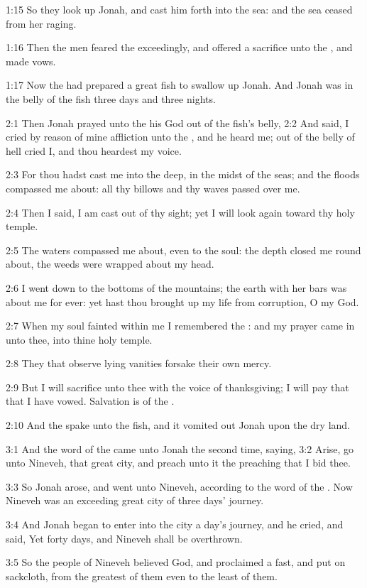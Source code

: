 1:15 So they look up Jonah, and cast him forth into the sea: and the sea ceased from her raging.

1:16 Then the men feared the \LORD exceedingly, and offered a sacrifice unto the \LORD, and made vows.

1:17 Now the \LORD had prepared a great fish to swallow up Jonah. And Jonah was in the belly of the fish three days and three nights.

2:1 Then Jonah prayed unto the \LORD his God out of the fish's belly, 2:2 And said, I cried by reason of mine affliction unto the \LORD, and he heard me; out of the belly of hell cried I, and thou heardest my voice.

2:3 For thou hadst cast me into the deep, in the midst of the seas; and the floods compassed me about: all thy billows and thy waves passed over me.

2:4 Then I said, I am cast out of thy sight; yet I will look again toward thy holy temple.

2:5 The waters compassed me about, even to the soul: the depth closed me round about, the weeds were wrapped about my head.

2:6 I went down to the bottoms of the mountains; the earth with her bars was about me for ever: yet hast thou brought up my life from corruption, O \LORD my God.

2:7 When my soul fainted within me I remembered the \LORD: and my prayer came in unto thee, into thine holy temple.

2:8 They that observe lying vanities forsake their own mercy.

2:9 But I will sacrifice unto thee with the voice of thanksgiving; I will pay that that I have vowed. Salvation is of the \LORD.

2:10 And the \LORD spake unto the fish, and it vomited out Jonah upon the dry land.

3:1 And the word of the \LORD came unto Jonah the second time, saying, 3:2 Arise, go unto Nineveh, that great city, and preach unto it the preaching that I bid thee.

3:3 So Jonah arose, and went unto Nineveh, according to the word of the \LORD. Now Nineveh was an exceeding great city of three days' journey.

3:4 And Jonah began to enter into the city a day's journey, and he cried, and said, Yet forty days, and Nineveh shall be overthrown.

3:5 So the people of Nineveh believed God, and proclaimed a fast, and put on sackcloth, from the greatest of them even to the least of them.

